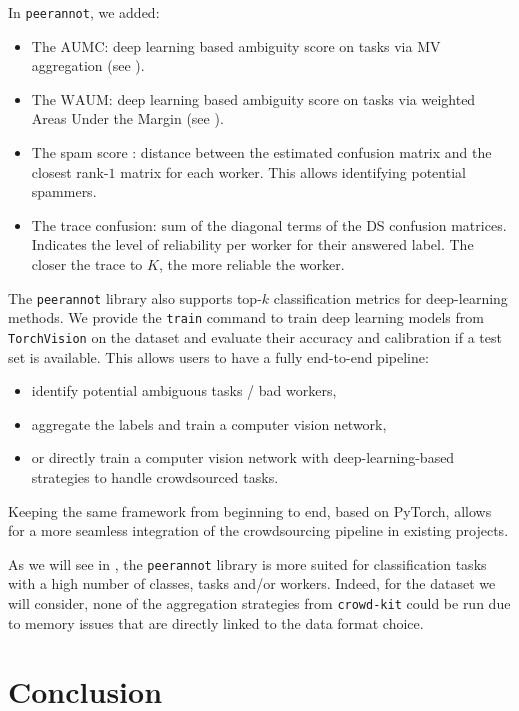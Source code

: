 In \texttt{peerannot}, we added:
\begin{itemize}
    \item The $\mathrm{AUMC}$: deep learning based ambiguity score on tasks via MV aggregation (see ).
    \item The $\mathrm{WAUM}$: deep learning based ambiguity score on tasks via weighted Areas Under the Margin (see ).
    \item The spam score \citep{raykar_ranking_2011}: distance between the estimated confusion matrix and the closest rank-$1$ matrix for each worker. This allows identifying potential spammers.
    \item The trace confusion: sum of the diagonal terms of the DS confusion matrices. Indicates the level of reliability per worker for their answered label. The closer the trace to $K$, the more reliable the worker.
\end{itemize}

The \texttt{peerannot} library also supports top-$k$ classification metrics for deep-learning methods.
We provide the \texttt{train} command to train deep learning models from \texttt{TorchVision} on the dataset and evaluate their accuracy and calibration if a test set is available. This allows users to have a fully end-to-end pipeline:
\begin{itemize}
    \item identify potential ambiguous tasks / bad workers,
    \item aggregate the labels and train a computer vision network,
    \item or directly train a computer vision network with deep-learning-based strategies to handle crowdsourced tasks.
\end{itemize}
Keeping the same framework from beginning to end, based on PyTorch, allows for a more seamless integration of the crowdsourcing pipeline in existing projects.

As we will see in , the \texttt{peerannot} library is more suited for classification tasks with a high number of classes, tasks and/or workers. Indeed, for the dataset we will consider, none of the aggregation strategies from \texttt{crowd-kit} could be run due to memory issues that are directly linked to the data format choice.

\section{Conclusion}

